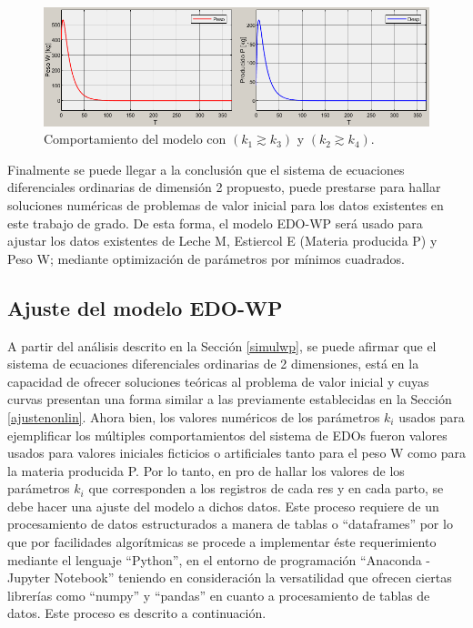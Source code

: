 \begin{itemize}
        \begin{figure}[H]
           \centering
           \includegraphics[scale=0.75]{img/k1MAPk3_k2MAPk4_k1Mk2.png}
           \caption{Comportamiento del modelo con $(k_{1}\gtrsim k_{3})$ y $(k_{2}\gtrsim k_{4})$. \label{kiMAPpng}}
        \end{figure}
            
\end{itemize}

Finalmente se puede llegar a la conclusión que el sistema de ecuaciones diferenciales ordinarias de dimensión 2 propuesto, puede prestarse para hallar soluciones numéricas de problemas de valor inicial para los datos existentes en este trabajo de grado. De esta forma, el modelo EDO-WP será usado para ajustar los datos existentes de Leche M, Estiercol E (Materia producida P) y Peso W; mediante optimización de parámetros por mínimos cuadrados.

\pagebreak
\subsection{Ajuste del modelo EDO-WP}\label{ajustemod}

A partir del análisis descrito en la Sección \ref{simulwp}, se puede afirmar que el sistema de ecuaciones diferenciales ordinarias de 2 dimensiones, está en la capacidad de ofrecer soluciones teóricas al problema de valor inicial y cuyas curvas presentan una forma similar a las previamente establecidas en la Sección \ref{ajustenonlin}.
Ahora bien, los valores numéricos de los parámetros $k_{i}$ usados para ejemplificar los múltiples comportamientos del sistema de EDOs fueron valores usados para valores iniciales ficticios o artificiales tanto para el peso W como para la materia producida P. Por lo tanto, en pro de hallar los valores de los parámetros $k_{i}$ que corresponden a los registros de cada res y en cada parto, se debe hacer una ajuste del modelo a dichos datos. Este proceso requiere de un procesamiento de datos estructurados a manera de tablas o ``dataframes'' por lo que por facilidades algorítmicas se procede a implementar éste requerimiento mediante el lenguaje ``Python'', en el entorno de programación ``Anaconda - Jupyter Notebook'' teniendo en consideración la versatilidad que ofrecen ciertas librerías como ``numpy'' y ``pandas'' en cuanto a procesamiento de tablas de datos. Este proceso es descrito a continuación.

